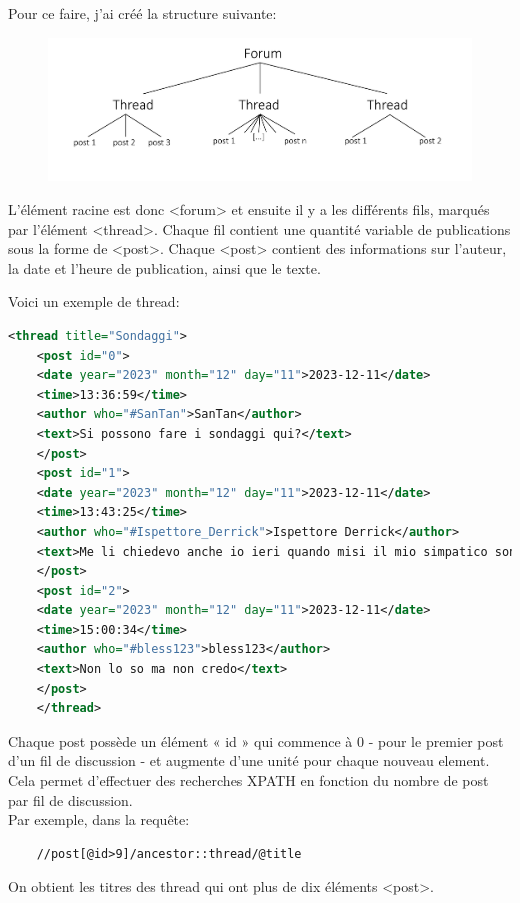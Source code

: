 \documentclass[12pt,a4paper]{article}
\begin{document}
Pour ce faire, j'ai créé la structure suivante: 
\newpage
\begin{center}
\begin{figure}[h!]
	\includegraphics[scale=0.3,]{../../images/image_1.png}
\end{figure}
\end{center}

L'élément racine est donc <forum> et ensuite il y a les différents fils, marqués par l'élément <thread>. Chaque fil contient une quantité variable de publications sous la forme de <post>. Chaque <post> contient des informations sur l'auteur, la date et l'heure de publication, ainsi que le texte.

Voici un exemple de thread: \\

\begin{lstlisting}[language=XML]
	<thread title="Sondaggi">
	<post id="0">
	<date year="2023" month="12" day="11">2023-12-11</date>
	<time>13:36:59</time>
	<author who="#SanTan">SanTan</author>
	<text>Si possono fare i sondaggi qui?</text>
	</post>
	<post id="1">
	<date year="2023" month="12" day="11">2023-12-11</date>
	<time>13:43:25</time>
	<author who="#Ispettore_Derrick">Ispettore Derrick</author>
	<text>Me li chiedevo anche io ieri quando misi il mio simpatico sondaggio su Gino&amp;C</text>
	</post>
	<post id="2">
	<date year="2023" month="12" day="11">2023-12-11</date>
	<time>15:00:34</time>
	<author who="#bless123">bless123</author>
	<text>Non lo so ma non credo</text>
	</post>
	</thread>

\end{lstlisting}

Chaque post possède un élément « id » qui commence à 0 - pour le premier post d'un fil de discussion - et augmente d'une unité pour chaque nouveau element. Cela permet d'effectuer des recherches XPATH en fonction du nombre de post par fil de discussion.\\

Par exemple, dans la requête:
 \begin{lstlisting}
	//post[@id>9]/ancestor::thread/@title 
\end{lstlisting} 
On obtient les titres des thread qui ont plus de dix éléments <post>.\\
\end{document}

